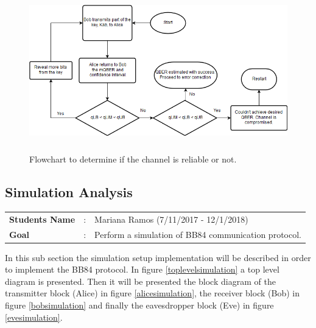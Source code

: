 	
\begin{figure}[H]
	\centering
	\includegraphics[width=1\textwidth,height=7cm]{./sdf/bb84_with_discrete_variables/figures/qberEstimation.png}
	\caption{Flowchart to determine if the channel is reliable or not.}\label{fig:flowQber}
\end{figure}



\newpage

\subsection{Simulation Analysis}

\begin{tcolorbox}	
\begin{tabular}{p{2.75cm} p{0.2cm} p{10.5cm}} 	
\textbf{Students Name}  &:& Mariana Ramos (7/11/2017 - 12/1/2018) \\
\textbf{Goal}          &:& Perform a simulation of BB84 communication protocol.
\end{tabular}
\end{tcolorbox}

In this sub section the simulation setup implementation will be described in order to implement the BB84 protocol. In figure \ref{toplevelsimulation} a top level diagram is presented. Then it will be presented the block diagram of the transmitter block (Alice) in figure \ref{alicesimulation}, the receiver block (Bob) in figure \ref{bobsimulation} and finally the eavesdropper block (Eve) in figure \ref{evesimulation}.

